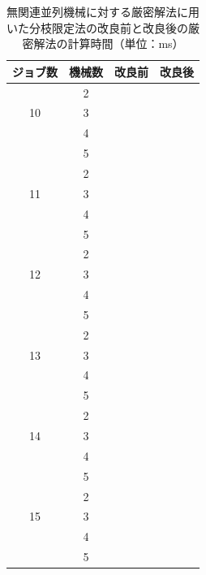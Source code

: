 \documentclass[12pt]{optlab-bachelor}
\begin{document}
\begin{table}[htb]
  \begin{center}
    \begin{tabular}{|c|c|c|c|} \hline
      ジョブ数 & 機械数 & 改良前 & 改良後 \\ \hline \hline
      & 2 &  &   \\ \cline{2-4}
      10 & 3 &  &   \\ \cline{2-4}
      & 4 &  &   \\ \cline{2-4}
      & 5 &  &   \\ \hline \hline
      & 2 &  &   \\ \cline{2-4}
      11 & 3 &  &  \\ \cline{2-4}
      & 4 &  &   \\ \cline{2-4}
      & 5 &  &   \\ \hline \hline
      & 2 &  &   \\ \cline{2-4}
      12 & 3 &  &   \\ \cline{2-4}
      & 4 &  &  \\ \cline{2-4}
      & 5 & &    \\ \hline \hline
      & 2 &  &  \\ \cline{2-4}
      13 & 3 &  &  \\ \cline{2-4}
      & 4 &  &  \\ \cline{2-4}
      & 5 &  &  \\ \hline \hline
      & 2 &  &  \\ \cline{2-4}
      14 & 3 &  &  \\ \cline{2-4}
      & 4 &  &  \\ \cline{2-4}
      & 5 &  &   \\ \hline \hline
      & 2 &  &  \\ \cline{2-4}
      15 & 3 &  &  \\ \cline{2-4}
      & 4 &  &  \\ \cline{2-4}
      & 5 &  &   \\ \hline \hline
    \end{tabular}
    \caption{無関連並列機械に対する厳密解法に用いた分枝限定法の改良前と改良後の厳密解法の計算時間（単位：ms）}
    \label{A4}
  \end{center}
\end{table}
\end{document}
